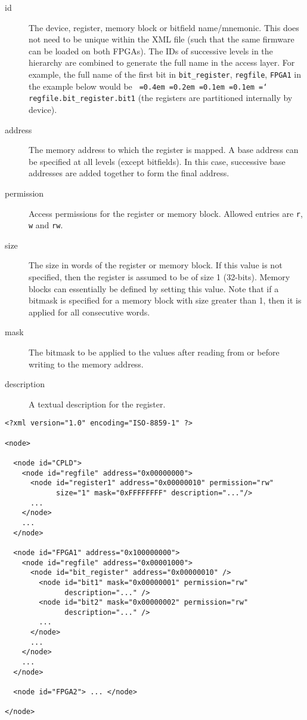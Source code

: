 \documentclass[a4paper,11pt]{article}
\newcommand*\justify{
  \fontdimen2\font=0.4em %
  \fontdimen3\font=0.2em %
  \fontdimen4\font=0.1em %
  \fontdimen7\font=0.1em %
  \hyphenchar\font=`\-   %
}
\begin{document}
\begin{description}
 \item[id] The device, register, memory block or bitfield name/mnemonic. This 
does not need to be unique within the XML file (such that the same firmware can 
be loaded on both FPGAs). The IDs of successive levels in the hierarchy are 
combined to generate the full name in the access layer. For example, the 
full name of the first bit in \texttt{bit\_register}, \texttt{regfile}, 
\texttt{FPGA1} in the example below would be 
\texttt{\justify regfile.bit\_register.bit1} (the registers are partitioned 
internally by device). 

 \item[address] The memory address to which the register is mapped. A base 
address can be specified at all levels (except bitfields). In this case, 
successive base addresses are added together to form the final address. 

 \item[permission] Access permissions for the register or memory block. Allowed 
entries are \texttt{r}, \texttt{w} and \texttt{rw}.

 \item[size] The size in words of the register or memory block. If this value 
is not specified, then the register is assumed to be of size 1 (32-bits). 
Memory blocks can essentially be defined by setting this value. Note that if a 
bitmask is specified for a memory block with size greater than 1, then it is 
applied for all consecutive words.
 
 \item[mask] The bitmask to be applied to the values after reading from or 
before writing to the memory address. 

 \item[description] A textual description for the register.
\end{description}


\begin{lstlisting}[caption=XML memory map]
<?xml version="1.0" encoding="ISO-8859-1" ?>

<node>

  <node id="CPLD">
    <node id="regfile" address="0x00000000">
      <node id="register1" address="0x00000010" permission="rw" 
            size="1" mask="0xFFFFFFFF" description="..."/>
      ...
    </node>
    ...
  </node>
  
  <node id="FPGA1" address="0x100000000">
    <node id="regfile" address="0x00001000">
      <node id="bit_register" address="0x00000010" />
        <node id="bit1" mask="0x00000001" permission="rw" 
              description="..." />
        <node id="bit2" mask="0x00000002" permission="rw" 
              description="..." />
        ...
      </node>
      ...
    </node> 
    ...
  </node>
  
  <node id="FPGA2"> ... </node>
  
</node>
\end{lstlisting}
\end{document}
